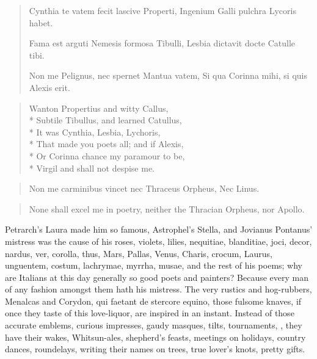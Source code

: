 \begin{latin}
\begin{verse}
Cynthia te vatem fecit lascive Properti,
Ingenium Galli pulchra Lycoris habet.

Fama est arguti Nemesis formosa Tibulli,
Lesbia dictavit docte Catulle tibi.

Non me Pelignus, nec spernet Mantua vatem,
Si qua Corinna mihi, si quis Alexis erit.
\end{verse}
\end{latin}
\translationrule%
\begin{verse}
Wanton Propertius and witty Callus,\\*
Subtile Tibullus, and learned Catullus,\\*
It was Cynthia, Lesbia, Lychoris,\\*
That made you poets all; and if Alexis,\\*
Or Corinna chance my paramour to be,\\*
Virgil and \Ovid shall not despise me.
\end{verse}

\begin{latin}
\begin{verse}
Non me carminibus vincet nec Thraceus Orpheus,
Nec Linus.
\end{verse}
\end{latin}
\translationrule%
\begin{verse}%
None shall excel me in poetry,
neither the Thracian Orpheus, nor Apollo.
\end{verse}%

Petrarch's Laura made him so famous, Astrophel's Stella, and Jovianus
Pontanus' mistress was the cause of his roses, violets, lilies,
nequitiae, blanditiae, joci, decor, nardus, ver, corolla, thus, Mars,
Pallas, Venus, Charis, crocum, Laurus, unguentem, costum, lachrymae,
myrrha, musae, \etc{} and the rest of his poems; why are Italians at this
day generally so good poets and painters? Because every man of any
fashion amongst them hath his mistress. The very rustics and
hog-rubbers, Menalcas and Corydon, qui faetant de stercore equino,
those fulsome knaves, if once they taste of this love-liquor, are
inspired in an instant. Instead of those accurate emblems, curious
impresses, gaudy masques, tilts, tournaments, \etc{}, they have their
wakes, Whitsun-ales, shepherd's feasts, meetings on holidays, country
dances, roundelays, writing their names on trees, true lover's
knots, pretty gifts.

